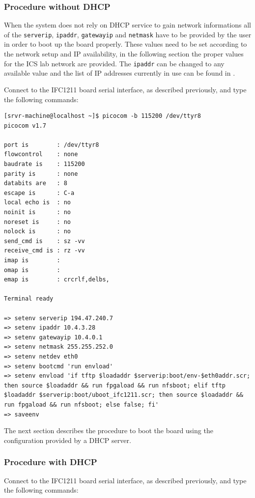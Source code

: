 \documentclass[11pt
  , a4paper
  , article
  , oneside
  , showtrims
]{memoir}
\begin{document}
\subsubsection{Procedure without DHCP}
When the system does not rely on DHCP service to gain network informations all of the \texttt{serverip}, \texttt{ipaddr}, \texttt{gatewayip} and \texttt{netmask} have to be provided by the user in order to boot up the board properly.
These values need to be set according to the network setup and IP availability, in the following section the proper values for the ICS lab network are provided. The \texttt{ipaddr} can be changed to any available value and the list of IP addresses currently in use can be found in \cite{ICSNA}.

Connect to the IFC1211 board serial interface, as described previously, and type the following commands:

\begin{lstlisting}[style=termstyle]
[srvr-machine@localhost ~]$ picocom -b 115200 /dev/ttyr8
picocom v1.7

port is        : /dev/ttyr8
flowcontrol    : none
baudrate is    : 115200
parity is      : none
databits are   : 8
escape is      : C-a
local echo is  : no
noinit is      : no
noreset is     : no
nolock is      : no
send_cmd is    : sz -vv
receive_cmd is : rz -vv
imap is        : 
omap is        : 
emap is        : crcrlf,delbs,

Terminal ready

=> setenv serverip 194.47.240.7
=> setenv ipaddr 10.4.3.28
=> setenv gatewayip 10.4.0.1
=> setenv netmask 255.255.252.0
=> setenv netdev eth0
=> setenv bootcmd 'run envload'
=> setenv envload 'if tftp $loadaddr $serverip:boot/env-$eth0addr.scr; then source $loadaddr && run fpgaload && run nfsboot; elif tftp $loadaddr $serverip:boot/uboot_ifc1211.scr; then source $loadaddr && run fpgaload && run nfsboot; else false; fi'
=> saveenv
\end{lstlisting}
 
The next section describes the procedure to boot the board using the configuration provided by a DHCP server.

\subsubsection{Procedure with DHCP}
Connect to the IFC1211 board serial interface, as described previously, and type the following commands:
\end{document}
